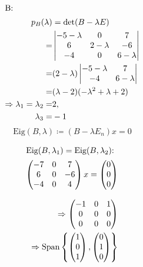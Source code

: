 \documentclass{HM}
\newcommand{\Eig}{\text{Eig}}
\newcommand{\Span}{\text{Span}}
\begin{document}
\begin{enumerate}
		\newpage
		\begin{align*}
			\intertext{B:}
			p_B(\lambda)&=\det(B-\lambda E)\\
			=&\begin{vmatrix}
				-5-\lambda&0&7\\
				6&2-\lambda&-6\\
				-4&0&6-\lambda\\
			\end{vmatrix}\\
			=&(2-\lambda)\begin{vmatrix}
				-5-\lambda&7\\
				-4&6-\lambda\\
			\end{vmatrix}\\
			=&(\lambda-2)(-\lambda^2+\lambda+2)\\
			\Rightarrow\lambda_1=\lambda_2=&2,\\
			\lambda_3=&-1
		\end{align*}
		$$\Eig(B,\lambda)\coloneqq (B-\lambda E_n)x=0$$
		\begin{minipage}{.5\textwidth}
			\begin{align*}
			\intertext{$\Eig(B, \lambda_1)=\Eig(B, \lambda_2)$:}
			\begin{pmatrix}
				-7&0&7\\
				6&0&-6\\
				-4&0&4
			\end{pmatrix}x=\begin{pmatrix}
				0\\0\\0
			\end{pmatrix}\\
			\intertext{}
			\Rightarrow\begin{pmatrix}
				-1&0&1\\
				0&0&0\\
				0&0&0
			\end{pmatrix}\\
			\Rightarrow\Span\left\lbrace\begin{pmatrix}
				1\\
				0\\
				1
			\end{pmatrix},\begin{pmatrix}
				0\\
				1\\
				0
			\end{pmatrix}\right\rbrace
			\end{align*}
		\end{minipage}

\end{enumerate}
\end{document}
